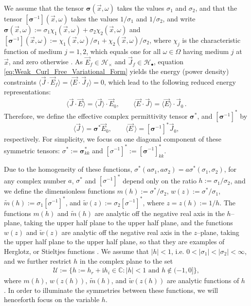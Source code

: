 \documentclass[jmp,graphicx]{revtex4-1}
\newcommand{\I}{\mathrm{i}}
\begin{document}
We assume that the tensor $\bm{\sigma}(\vec{x},\omega)$ takes the values $\sigma_1$
and $\sigma_2$, and that the tensor $[\bm{\sigma}^{-1}](\vec{x},\omega)$ takes the
values $1/\sigma_1$ and $1/\sigma_2$, and write 
$\bm{\sigma}(\vec{x},\omega):=\sigma_1\chi_1(\vec{x},\omega)+\sigma_2\chi_2(\vec{x},\omega)$ and
$[\bm{\sigma}^{-1}](\vec{x},\omega):=\chi_1(\vec{x},\omega)/\sigma_1+\chi_2(\vec{x},\omega)/\sigma_2$,
where $\chi_j$ is the characteristic function of medium $j=1,2$, which
equals one for all $\omega\in\Omega$ having medium $j$ at $\vec{x}$, and zero
otherwise \cite{Golden:CMP-473}. As $\vec{E}_f\in\mathscr{H}_\times$ and
$\vec{J}_f\in\mathscr{H}_{\bullet}$, equation
\eqref{eq:Weak_Curl_Free_Variational_Form}
yields the energy (power density) constraints
$\langle\vec{J}\cdot\vec{E}_f\rangle=\langle\vec{E}\cdot\vec{J}_f\rangle=0$, which lead to the
following reduced energy representations:   
%
\begin{align}\label{eq:Reduced_System_Energy_Representations}
  \langle\vec{J}\cdot\vec{E}\rangle=\langle\vec{J}\rangle\cdot\vec{E}_0, \qquad
  \langle\vec{E}\cdot\vec{J}\rangle=\langle\vec{E}\rangle\cdot\vec{J}_0\,.
\end{align}
%
Therefore, we define the effective complex permittivity
tensor $\bm{\sigma}^*$, and $[\bm{\sigma}^{-1}]^*$ by 
%
\begin{equation}\label{eq:eff_eps_def}
    \langle \vec{J} \,\rangle=  \bm{\sigma}^* \vec{E}_0,\qquad
    \langle \vec{E} \,\rangle=  [\bm{\sigma}^{-1}]^*\vec{J}_0,
\end{equation}
%
respectively. For simplicity, we focus on one diagonal component of
these symmetric tensors: $\sigma^*:=\bm{\sigma}^*_{kk}$ and
$[\sigma^{-1}]^*:=[\bm{\sigma}^{-1}]^*_{kk}$.

Due to the homogeneity of these functions,
$\sigma^*(a\sigma_1,a\sigma_2)=a\sigma^*(\sigma_1,\sigma_2)$, for any complex number $a$, $\sigma^*$ and
$[\sigma^{-1}]^*$ depend only on the ratio $h:=\sigma_1/\sigma_2$, and we define the
dimensionless functions $m(h):=\sigma^*/\sigma_2$, $w(z):=\sigma^*/\sigma_1$,
$\tilde{m}(h):=\sigma_1[\sigma^{-1}]^*$, and $\tilde{w}(z):=\sigma_2[\sigma^{-1}]^*$, where 
$z=z(h):=1/h$. The functions $m(h)$ and $\tilde{m}(h)$ are analytic off the
negative real axis in the $h$--plane, taking the upper half plane to
the upper half plane, and the functions $w(z)$ and $\tilde{w}(z)$ are
analytic off the negative real axis in the $z$--plane, taking the
upper half plane to the upper half plane, so that they are examples of
Herglotz, or Stieltjes functions \cite{Golden:CMP-473}. We assume that
$|h|<1$, i.e. $0<|\sigma_1|<|\sigma_2|<\infty$, and we further restrict $h$ in the
complex plane to the set    
%
\begin{align}\label{eq:h_Domain}
  \mathcal{U}:=\{h:=h_r+\I h_i\in\mathbb{C}: |h|<1 \text{ and } h\not\in(-1,0]\},
\end{align}
%
where $m(h)$, $w(z(h))$, $\tilde{m}(h)$, and $\tilde{w}(z(h))$ are
analytic functions of $h$ \cite{Golden:CMP-473}. In order to
illuminate the symmetries between these functions, we will henceforth
focus on the variable $h$.
\end{document}
